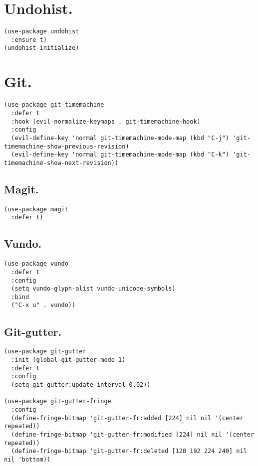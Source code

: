 \documentclass[11pt]{article}
\begin{document}
\section{Undohist.}
\label{sec:orgae4e5f6}
\begin{verbatim}
(use-package undohist
  :ensure t)
(undohist-initialize)
\end{verbatim}
\section{Git.}
\label{sec:org20446c7}
\begin{verbatim}
(use-package git-timemachine
  :defer t
  :hook (evil-normalize-keymaps . git-timemachine-hook)
  :config
  (evil-define-key 'normal git-timemachine-mode-map (kbd "C-j") 'git-timemachine-show-previous-revision)
  (evil-define-key 'normal git-timemachine-mode-map (kbd "C-k") 'git-timemachine-show-next-revision))
\end{verbatim}
\subsection{Magit.}
\label{sec:org8a07c8b}
\begin{verbatim}
(use-package magit
  :defer t)
\end{verbatim}
\subsection{Vundo.}
\label{sec:orgd638b4c}
\begin{verbatim}
(use-package vundo
  :defer t
  :config
  (setq vundo-glyph-alist vundo-unicode-symbols)
  :bind
  ("C-x u" . vundo))
\end{verbatim}
\subsection{Git-gutter.}
\label{sec:org7e9e80f}
\begin{verbatim}
(use-package git-gutter
  :init (global-git-gutter-mode 1)
  :defer t
  :config
  (setq git-gutter:update-interval 0.02))

(use-package git-gutter-fringe
  :config
  (define-fringe-bitmap 'git-gutter-fr:added [224] nil nil '(center repeated))
  (define-fringe-bitmap 'git-gutter-fr:modified [224] nil nil '(center repeated))
  (define-fringe-bitmap 'git-gutter-fr:deleted [128 192 224 240] nil nil 'bottom))
\end{verbatim}
\end{document}
